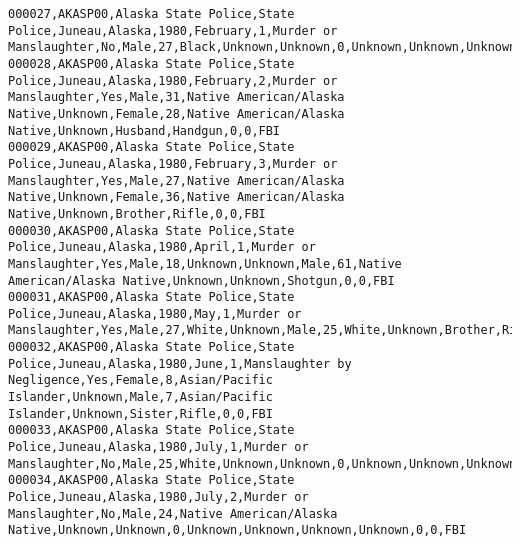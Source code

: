 \begin{lstlisting}
000027,AKASP00,Alaska State Police,State Police,Juneau,Alaska,1980,February,1,Murder or Manslaughter,No,Male,27,Black,Unknown,Unknown,0,Unknown,Unknown,Unknown,Handgun,0,0,FBI
000028,AKASP00,Alaska State Police,State Police,Juneau,Alaska,1980,February,2,Murder or Manslaughter,Yes,Male,31,Native American/Alaska Native,Unknown,Female,28,Native American/Alaska Native,Unknown,Husband,Handgun,0,0,FBI
000029,AKASP00,Alaska State Police,State Police,Juneau,Alaska,1980,February,3,Murder or Manslaughter,Yes,Male,27,Native American/Alaska Native,Unknown,Female,36,Native American/Alaska Native,Unknown,Brother,Rifle,0,0,FBI
000030,AKASP00,Alaska State Police,State Police,Juneau,Alaska,1980,April,1,Murder or Manslaughter,Yes,Male,18,Unknown,Unknown,Male,61,Native American/Alaska Native,Unknown,Unknown,Shotgun,0,0,FBI
000031,AKASP00,Alaska State Police,State Police,Juneau,Alaska,1980,May,1,Murder or Manslaughter,Yes,Male,27,White,Unknown,Male,25,White,Unknown,Brother,Rifle,0,0,FBI
000032,AKASP00,Alaska State Police,State Police,Juneau,Alaska,1980,June,1,Manslaughter by Negligence,Yes,Female,8,Asian/Pacific Islander,Unknown,Male,7,Asian/Pacific Islander,Unknown,Sister,Rifle,0,0,FBI
000033,AKASP00,Alaska State Police,State Police,Juneau,Alaska,1980,July,1,Murder or Manslaughter,No,Male,25,White,Unknown,Unknown,0,Unknown,Unknown,Unknown,Unknown,0,0,FBI
000034,AKASP00,Alaska State Police,State Police,Juneau,Alaska,1980,July,2,Murder or Manslaughter,No,Male,24,Native American/Alaska Native,Unknown,Unknown,0,Unknown,Unknown,Unknown,Unknown,0,0,FBI
\end{lstlisting}

